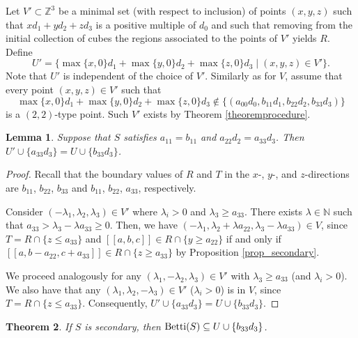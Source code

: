 \documentclass[12pt]{article}
\newtheorem{thm}{Theorem}[section]
\newtheorem{lemma}[thm]{Lemma}
\theoremstyle{remark}
\begin{document}
Let $V' \subset \mathbb{Z}^3$ be a minimal set (with respect to inclusion) of points $(x,y,z)$ such that $xd_1 + yd_2 +zd_3$ is a positive multiple of $d_0$ and such that removing from the initial collection of cubes the regions associated to the points of $V'$ yields $R$. 
Define
$$ U' = \{ \max\{ x,0\} d_1 + \max\{y,0\}d_2 + \max\{z,0\}d_3 \mid (x,y,z) \in V' \}.$$
Note that $U'$ is independent of the choice of $V'$. Similarly as for $V$, assume that every point $(x,y,z) \in V'$ such that
$$ \max\{ x,0\} d_1 + \max\{y,0\}d_2 + \max\{z,0\}d_3 \notin \{(a_{00}d_0,b_{11}d_1,b_{22}d_2,b_{33}d_3)\}$$
is a $(2,2)$-type point. Such $V'$ exists by Theorem \ref{theoremprocedure}.

\begin{lemma}\label{lemmaU_secondary}
    Suppose that $S$ satisfies $a_{11} = b_{11}$ and $a_{22}d_2 = a_{33}d_3$. Then $ U' \cup \{a_{33}d_3\} = U \cup \{b_{33}d_3\}$.
\end{lemma}

\begin{proof}
    Recall that the boundary values of $R$ and $T$ in the $x$-, $y$-, and $z$-directions are $b_{11}$, $b_{22}$, $b_{33}$ and $b_{11}$, $b_{22}$, $a_{33}$, respectively. 
    

    Consider $(-\lambda_1,\lambda_2,\lambda_3) \in V'$ where $\lambda_i > 0$ and $\lambda_3 \geq a_{33}$. There exists $\lambda \in \mathbb{N}$ such that $a_{33} > \lambda_3 - \lambda a_{33} \geq 0$. Then, we have $(-\lambda_1,\lambda_2 + \lambda a_{22},\lambda_3-\lambda a_{33}) \in V$, since $T = R \cap \{z \leq a_{33}\}$ and $[[a,b,c]] \in R \cap \{y \geq a_{22}\}$ if and only if $[[a,b-a_{22},c+a_{33}]] \in R \cap \{z \geq a_{33}\}$ by Proposition \ref{prop_secondary}.
    
    We proceed analogously for any $(\lambda_1,-\lambda_2,\lambda_3) \in V'$ with $\lambda_3 \geq a_{33}$  (and $\lambda_i > 0$). We also have that any $(\lambda_1,\lambda_2,-\lambda_3) \in V'$ ($\lambda_i > 0$) is in $V$, since $T = R \cap \{z \leq a_{33}\}$. Consequently, $ U' \cup \{a_{33}d_3\} = U \cup \{b_{33}d_3\}$.    
\end{proof}

\begin{thm}\label{theorembettifind_secondary}
If $S$ is secondary, then $\textup{Betti}(S) \subseteq U \cup \{b_{33}d_3\}$. 
\end{thm}
\end{document}
